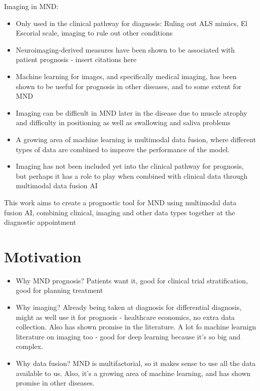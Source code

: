 \noindent Imaging in MND:
\begin{itemize}
    \item Only used in the clinical pathway for diagnosis: Ruling out ALS mimics, El Escorial scale, imaging to rule out other conditions
    \item Neuroimaging-derived measures have been shown to be associated with patient prognosis - insert citations here
    \item Machine learning for images, and specifically medical imaging, has been shown to be useful for prognosis in other diseases, and to some extent for MND
    \item Imaging can be difficult in MND later in the disease due to muscle atrophy and difficulty in positioning as well as swallowing and saliva problems
    \item A growing area of machine learning is multimodal data fusion, where different types of data are combined to improve the performance of the model.
    \item Imaging has not been included yet into the clinical pathway for prognosis, but perhaps it has a role to play when combined with clinical data through multimodal data fusion AI
\end{itemize}


This work aims to create a prognostic tool for MND using multimodal data fusion AI, combining clinical, imaging and other data types together at the diagnostic appointment


\section{Motivation}

\begin{itemize}
    \item Why MND prognosis? Patients want it, good for clinical trial stratification, good for planning treatment
    \item Why imaging? Already being taken at diagnosis for differential diagnosis, might as well use it for prognosis - healthcare economics, no extra data collection. Also has shown promise in the literature. A lot fo machine learnign literature on imaging too - good for deep learning because it's so big and complex.
    \item Why data fusion? MND is multifactorial, so it makes sense to use all the data available to us. Also, it's a growing area of machine learning, and has shown promise in other diseases.
\end{itemize}

